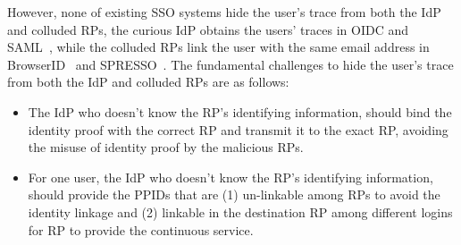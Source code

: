However, none of existing SSO systems hide the user's trace from both the IdP and colluded RPs, the curious IdP obtains the users' traces in OIDC and SAML~\cite{SAMLIdentifier, OpenIDConnect}, while the colluded RPs link the user with the same email address in BrowserID~\cite{persona} and SPRESSO~\cite{SPRESSO}.
The fundamental challenges to hide the user's trace from both the IdP and colluded RPs are as follows: %
\begin{itemize}
\item The IdP who doesn't know the RP's identifying information, should bind the identity proof with the correct RP and  transmit it to the exact RP, avoiding the misuse of identity proof by the malicious RPs.
\item For one user, the IdP who doesn't know the RP's identifying information, should provide the PPIDs that are (1) un-linkable among RPs to avoid the identity linkage and (2) linkable in the destination RP among different logins for RP to provide the continuous service.

\end{itemize}


